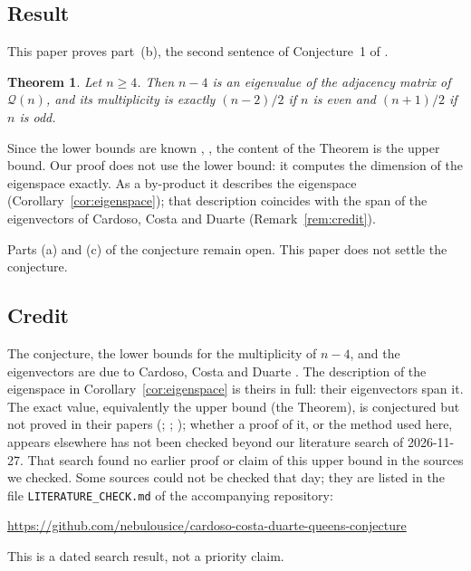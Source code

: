 \documentclass[11pt]{amsart}
\theoremstyle{plain}
\newtheorem*{mainthm}{Theorem}
\theoremstyle{definition}
\theoremstyle{remark}
\numberwithin{equation}{section}
\newcommand{\QG}{\mathcal{Q}}          %
\begin{document}
\subsection{Result}
This paper proves part~(b), the second sentence of Conjecture~1 of \cite{CCD23}.

\begin{mainthm}
Let \(n\ge4\). Then \(n-4\) is an eigenvalue of the adjacency matrix of \(\QG(n)\), and
its multiplicity is exactly \((n-2)/2\) if \(n\) is even and \((n+1)/2\) if \(n\) is odd.
\end{mainthm}

Since the lower bounds are known \cite[Theorem~3.10]{CCD20}, \cite[Corollary~4.2]{CCD23},
the content of the Theorem is the upper bound. Our proof does not use the lower bound: it computes the dimension of
the eigenspace exactly. As a by-product it describes the eigenspace
(Corollary~\ref{cor:eigenspace}); that description coincides with the span of the
eigenvectors of Cardoso, Costa and Duarte (Remark~\ref{rem:credit}).

Parts (a) and (c) of the conjecture remain open. This paper does not settle the
conjecture.

\subsection{Credit}
The conjecture, the lower bounds for the multiplicity of \(n-4\), and the eigenvectors
are due to Cardoso, Costa and Duarte \cite{CCD20,CCD23}. The description of the
eigenspace in Corollary~\ref{cor:eigenspace} is theirs in full: their eigenvectors span
it. The exact value, equivalently the upper bound (the Theorem), is conjectured but not proved in their papers (\cite[Conjecture~3]{CCD20}; \cite[Conjecture~1]{CCD23}; \cite[Conjecture~4.1]{CCD25}); whether a proof of it,
or the method used here, appears elsewhere has not been checked beyond our literature search of 2026-11-27.
That search found no earlier proof or
claim of this upper bound in the sources we checked. Some sources could not be checked that day; they
are listed in the file \nolinkurl{LITERATURE_CHECK.md} of the accompanying repository:
\begin{center}
\footnotesize\url{https://github.com/nebulousice/cardoso-costa-duarte-queens-conjecture}
\end{center}
This is a dated search result, not a priority claim.
\end{document}
